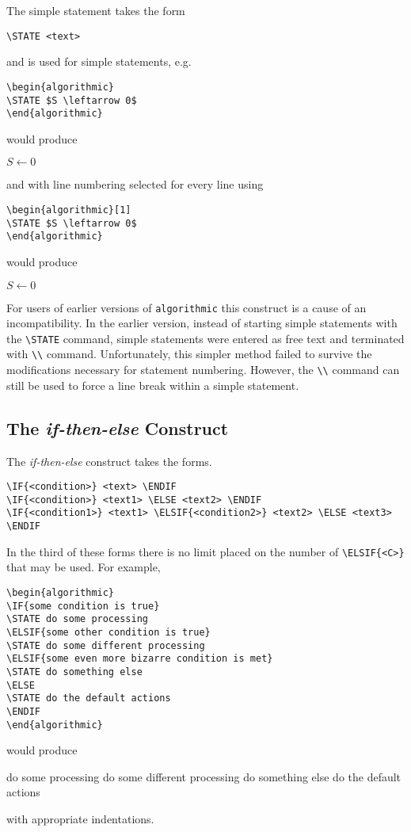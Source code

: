 \documentclass{article}
\newcommand{\keyword}[1]{\texttt{#1}}
\begin{document}
The simple statement takes the form
\begin{verbatim}
\STATE <text>
\end{verbatim}
and is used for simple statements, e.g.
\begin{verbatim}
\begin{algorithmic}
\STATE $S \leftarrow 0$
\end{algorithmic}
\end{verbatim}
would produce
\begin{algorithmic}
\STATE $S \leftarrow 0$
\end{algorithmic}
and with line numbering selected for every line using
\begin{verbatim}
\begin{algorithmic}[1]
\STATE $S \leftarrow 0$
\end{algorithmic}
\end{verbatim}
would produce
\begin{algorithmic}[1]
\STATE $S \leftarrow 0$
\end{algorithmic}
For users of earlier versions of \keyword{algorithmic} this construct is
a cause of an incompatibility.
In the earlier version, instead of starting simple statements with the
\verb+\STATE+
command, simple statements were entered as free text and terminated with
\verb+\\+ command.
Unfortunately, this simpler method failed to survive the modifications
necessary for statement numbering.
However, the \verb+\\+ command can still be used to force a line break within
a simple statement.

\subsection{The {\em if-then-else} Construct}

The {\em if-then-else} construct takes the forms.
\begin{verbatim}
\IF{<condition>} <text> \ENDIF
\IF{<condition>} <text1> \ELSE <text2> \ENDIF
\IF{<condition1>} <text1> \ELSIF{<condition2>} <text2> \ELSE <text3> \ENDIF
\end{verbatim}
In the third of these forms there is no limit placed on the number
of \verb+\ELSIF{<C>}+ that may be used.
For example,
\begin{verbatim}
\begin{algorithmic}
\IF{some condition is true}
\STATE do some processing
\ELSIF{some other condition is true}
\STATE do some different processing
\ELSIF{some even more bizarre condition is met}
\STATE do something else
\ELSE
\STATE do the default actions
\ENDIF
\end{algorithmic}
\end{verbatim}
would produce
\begin{algorithmic}
\STATE do some processing
\STATE do some different processing
\STATE do something else
\ELSE
\STATE do the default actions
\ENDIF
\end{algorithmic}
with appropriate indentations.
\end{document}

